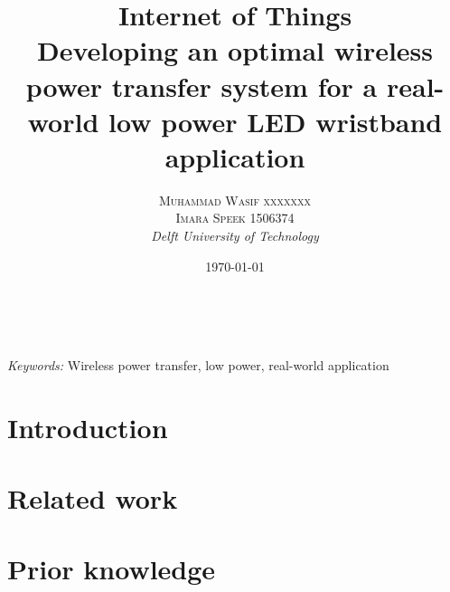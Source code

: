 \documentclass[a4paper, 10pt]{article}
\title{\textbf{Internet of Things }\\ %
Developing an optimal wireless power transfer system for a real-world low power LED wristband application} %
\author{\textsc{Muhammad Wasif xxxxxxx\\
Imara Speek 1506374} %
\\{\textit{Delft University of Technology}}} %
\date{\today} %
\makeatletter
\renewcommand{\maketitle}{ %
\begin{flushright} %
{\LARGE\@title} %

\vspace{50pt} %

{\large\@author} %
\\\@date %


\vspace{40pt} %
\end{flushright}
}
\makeatother
\begin{document}
\maketitle %



\begin{abstract}
\end{abstract}

\hspace*{3,6mm}\textit{Keywords:} Wireless power transfer, low power, real-world application %

\vspace{30pt} %


\section{Introduction}
\label{sec:intro}




\section{Related work}
\label{sec:related}




\section{Prior knowledge}
\label{sec:prior}

\end{document}
